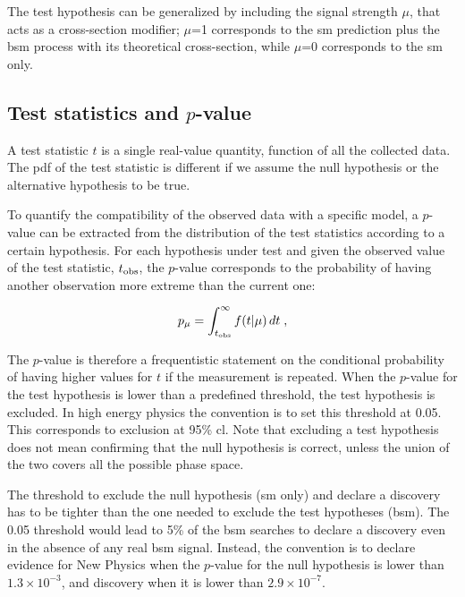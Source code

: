 \noindent The test hypothesis can be generalized by including the signal strength $\mu$, that acts as a cross-section modifier; $\mu$=1 corresponds to the \gls{sm} prediction plus the \gls{bsm} process with its theoretical cross-section, while $\mu$=0 corresponds to the \gls{sm} only.

\subsection{Test statistics and $p$-value}

 A test statistic $t$ is a single real-value quantity, function of all the collected data. The \gls{pdf} of the test statistic is different if we assume the null hypothesis or the alternative hypothesis to be true.

To quantify the compatibility of the observed data with a specific model, a $p$-value can be extracted from the distribution of the test statistics according to a certain hypothesis. For each hypothesis under test and given the observed value of the test statistic, $t_{{\rm obs}}$, the $p$-value corresponds to the probability of having another observation more extreme than the current one:

\begin{equation}
\label{eq:stat:pval}
p_{\mu} = \int_{t_{{\rm obs}}}^{\infty} f(t | \mu ) \,
d t \; ,
\end{equation}

The $p$-value is therefore a frequentistic statement on the conditional probability of having higher values for $t$ if the measurement is repeated. When the $p$-value for the test hypothesis is lower than a predefined threshold, the test hypothesis is excluded. In high energy physics the convention is to set this threshold at 0.05. This corresponds to exclusion at 95\% \gls{cl}. Note that excluding a test hypothesis does not mean confirming that the null hypothesis is correct, unless the union of the two covers all the possible phase space.

The threshold to exclude the null hypothesis (\gls{sm} only) and declare a discovery has to be tighter than the one needed to exclude the test hypotheses (\gls{bsm}). The 0.05 threshold would lead to 5\% of the \gls{bsm} searches to declare a discovery even in the absence of any real \gls{bsm} signal. Instead, the convention is to declare evidence for New Physics when the $p$-value for the null hypothesis is lower than $1.3 \times 10^{-3}$, and discovery when it is lower than $2.9 \times 10^{-7}$.

